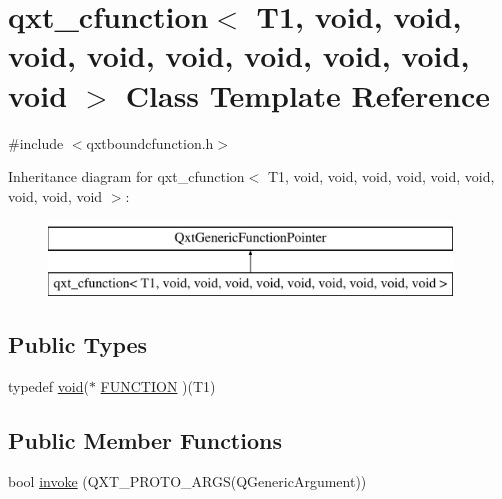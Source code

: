 \hypertarget{classqxt__cfunction_3_01_t1_00_01void_00_01void_00_01void_00_01void_00_01void_00_01void_00_01void_00_01void_00_01void_01_4}{\section{qxt\-\_\-cfunction$<$ T1, void, void, void, void, void, void, void, void, void $>$ Class Template Reference}
\label{classqxt__cfunction_3_01_t1_00_01void_00_01void_00_01void_00_01void_00_01void_00_01void_00_01void_00_01void_00_01void_01_4}
}


{\ttfamily \#include $<$qxtboundcfunction.\-h$>$}

Inheritance diagram for qxt\-\_\-cfunction$<$ T1, void, void, void, void, void, void, void, void, void $>$\-:\begin{figure}[H]
\begin{center}
\leavevmode
\includegraphics[height=2.000000cm]{classqxt__cfunction_3_01_t1_00_01void_00_01void_00_01void_00_01void_00_01void_00_01void_00_01void_00_01void_00_01void_01_4}
\end{center}
\end{figure}
\subsection*{Public Types}
\begin{DoxyCompactItemize}
\item 
typedef \hyperlink{group___u_a_v_objects_plugin_ga444cf2ff3f0ecbe028adce838d373f5c}{void}($\ast$ \hyperlink{classqxt__cfunction_3_01_t1_00_01void_00_01void_00_01void_00_01void_00_01void_00_01void_00_01void_00_01void_00_01void_01_4_a308014a7c07281f5ca21cfae5f1fd02c}{F\-U\-N\-C\-T\-I\-O\-N} )(T1)
\end{DoxyCompactItemize}
\subsection*{Public Member Functions}
\begin{DoxyCompactItemize}
\item 
bool \hyperlink{classqxt__cfunction_3_01_t1_00_01void_00_01void_00_01void_00_01void_00_01void_00_01void_00_01void_00_01void_00_01void_01_4_aca2373f356996c8b2aed9b60fef21fb9}{invoke} (Q\-X\-T\-\_\-\-P\-R\-O\-T\-O\-\_\-A\-R\-G\-S(Q\-Generic\-Argument))
\end{DoxyCompactItemize}
